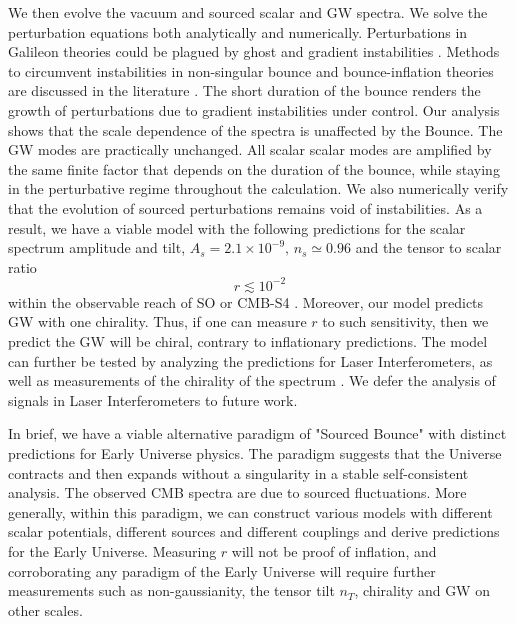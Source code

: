 \documentclass[12pt,a4paper]{article}
\newcommand{\be}{\begin{equation}}
\newcommand{\ee}{\end{equation}}
\numberwithin{equation}{section}
\numberwithin{equation}{section}
\begin{document}
We then evolve the vacuum and sourced scalar and GW spectra.  %
We solve the perturbation equations both analytically and numerically. Perturbations in Galileon theories could be plagued by ghost and gradient instabilities \cite{Libanov:2016kfc}. Methods to circumvent instabilities in non-singular bounce and bounce-inflation theories are discussed in the literature \cite{Cai:2016thi,Cai:2017tku,Cai:2017dyi}. The short duration of the bounce renders the growth of perturbations due to gradient instabilities under control. %
Our analysis shows that the scale dependence of the spectra is unaffected by the Bounce. The GW modes are practically unchanged. All scalar scalar modes are amplified by the same finite factor that depends on the duration of the bounce, while staying in the perturbative regime throughout the calculation. We also numerically verify that the evolution of sourced perturbations remains void of instabilities.
As a result, we have a viable model with the following predictions for the scalar spectrum amplitude and tilt, $A_s=2.1\times 10^{-9},\, n_s\simeq 0.96$  and the tensor to scalar ratio
\be
r\lesssim10^{-2}
\ee
within the observable reach of SO or CMB-S4 \cite{CMB-S4:2020lpa,Hensley:2021ydb,Namikawa:2021gyh}. 
Moreover, our model predicts GW with one chirality. Thus, if one can measure $r$ to such sensitivity, then we predict the GW will be chiral, contrary to inflationary predictions. The model can further be tested by analyzing the predictions for Laser Interferometers, as well as measurements of the chirality of the spectrum \cite{LIGOScientific:2019vkc,Abbott:2016blz,AmaroSeoane:2012km,PhysRevD.81.123529}. We defer the analysis of signals in Laser Interferometers to future work. 

In brief, we have a viable alternative paradigm of "Sourced Bounce" with distinct predictions for Early Universe physics. The paradigm suggests that the Universe contracts and then expands without a singularity in a stable self-consistent analysis. The observed CMB spectra are due to sourced fluctuations. More generally, within this paradigm, we can construct various models with different scalar potentials, different sources and different couplings and derive predictions for the Early Universe. Measuring $r$ will not be proof of inflation, and corroborating any paradigm of the Early Universe will require further measurements such as non-gaussianity, the tensor tilt $n_T$, chirality and GW on other scales.
\end{document}
